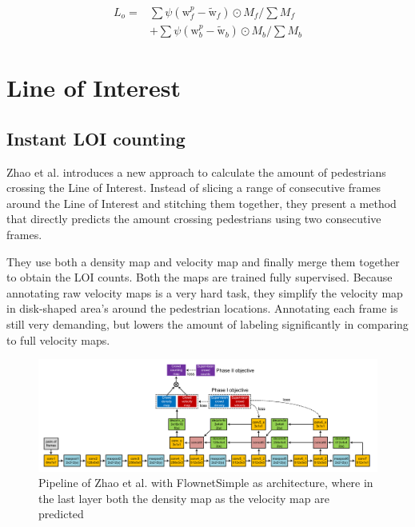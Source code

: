 \begin{equation}
\begin{aligned}
L_{o}=&\sum \psi\left(\mathrm{w}_{f}^{p}-\widetilde{\mathrm{w}}_{f}\right) \odot M_{f} / \sum M_{f} \\
&+\sum \psi\left(\mathrm{w}_{b}^{p}-\widetilde{\mathrm{w}}_{b}\right) \odot M_{b} / \sum M_{b}
\end{aligned}
\label{eq:student_pm_loss}
\end{equation}

\section{Line of Interest}

\subsection{Instant LOI counting}
\label{section:crossing_line_2016}
Zhao et al. \cite{leibe_crossing-line_2016} introduces a new approach to calculate the amount of pedestrians crossing the Line of Interest. Instead of slicing a range of consecutive frames around the Line of Interest and stitching them together, they present a method that directly predicts the amount crossing pedestrians using two consecutive frames.

They use both a density map and velocity map and finally merge them together to obtain the LOI counts. Both the maps are trained fully supervised. Because annotating raw velocity maps is a very hard task, they simplify the velocity map in disk-shaped area's around the pedestrian locations. Annotating each frame is still very demanding, but lowers the amount of labeling significantly in comparing to full velocity maps.

\begin{figure}[h]
\centering
\includegraphics[width=1.0\textwidth]{images/zhao16_model}
\caption{Pipeline of Zhao et al. with FlownetSimple as architecture, where in the last layer both the density map as the velocity map are predicted}
\label{fig:zhao_model}
\end{figure}

